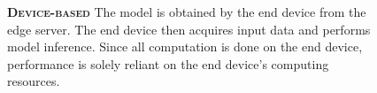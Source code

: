 \begin{figure}
	\begin{minipage}{0.65\linewidth}
		\textbf{\protect{} \textsc{Device-based}}
		\color{caption-color} \newline
		The model is obtained by the end device from the edge server. The end device then acquires input data and performs model inference. Since all computation is done on the end device, performance is solely reliant on the end device's computing resources. 
	\end{minipage}%
	\hfill
	\begin{minipage}{0.3\linewidth}
		\centering
		\captionsetup[subfigure]{justification=centering}
		\begin{figure}
			\centering
		\end{figure}
	\end{minipage}
	

\end{figure}
